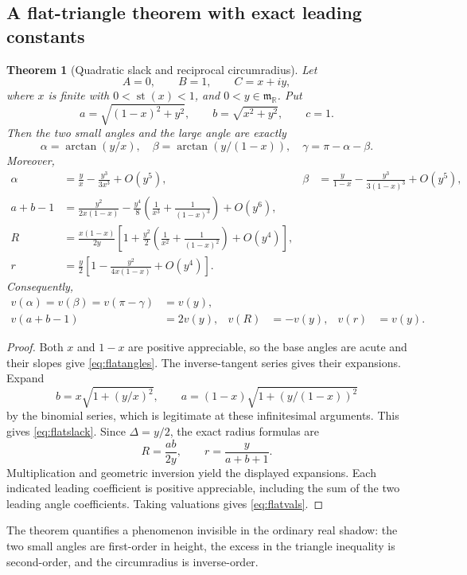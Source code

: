 \documentclass[11pt]{article}
\numberwithin{equation}{section}
\newtheorem{theorem}{Theorem}[section]
\theoremstyle{definition}
\newcommand{\R}{\mathbb R}
\newcommand{\mm}{\mathfrak m}
\newcommand{\st}{\operatorname{st}}
\begin{document}
\subsection{A flat-triangle theorem with exact leading constants}
\begin{theorem}[Quadratic slack and reciprocal circumradius]\label{thm:flat}
Let
\[
 A=0,\qquad B=1,\qquad C=x+iy,
\]
where $x$ is finite with $0<\st(x)<1$, and $0<y\in\mm_{\R}$. Put
\[
 a=\sqrt{(1-x)^2+y^2},\qquad b=\sqrt{x^2+y^2},\qquad c=1.
\]
Then the two small angles and the large angle are exactly
\begin{equation}\label{eq:flatangles}
 \alpha=\arctan(y/x),\quad
 \beta=\arctan(y/(1-x)),\quad
 \gamma=\pi-\alpha-\beta.
\end{equation}
Moreover,
\begin{align}
 \alpha&=\frac yx-\frac{y^3}{3x^3}+O(y^5),&
 \beta&=\frac y{1-x}-\frac{y^3}{3(1-x)^3}+O(y^5),\\
 a+b-1&=\frac{y^2}{2x(1-x)}
 -\frac{y^4}{8}\left(\frac1{x^3}+\frac1{(1-x)^3}\right)+O(y^6),
 \label{eq:flatslack}\\
 R&=\frac{x(1-x)}{2y}
 \left[1+\frac{y^2}{2}\left(\frac1{x^2}+\frac1{(1-x)^2}\right)+O(y^4)\right],\\
 r&=\frac y2\left[1-\frac{y^2}{4x(1-x)}+O(y^4)\right].
\end{align}
Consequently,
\begin{align}
 v(\alpha)=v(\beta)=v(\pi-\gamma)&=v(y),\\
 v(a+b-1)&=2v(y),& v(R)&=-v(y),&v(r)&=v(y).
 \label{eq:flatvals}
\end{align}
\end{theorem}
\begin{proof}
Both $x$ and $1-x$ are positive appreciable, so the base angles are acute and their slopes give \eqref{eq:flatangles}. The inverse-tangent series gives their expansions. Expand
\[
 b=x\sqrt{1+(y/x)^2},\qquad
 a=(1-x)\sqrt{1+(y/(1-x))^2}
\]
by the binomial series, which is legitimate at these infinitesimal arguments. This gives \eqref{eq:flatslack}. Since $\Delta=y/2$, the exact radius formulas are
\[
 R=\frac{ab}{2y},\qquad r=\frac{y}{a+b+1}.
\]
Multiplication and geometric inversion yield the displayed expansions. Each indicated leading coefficient is positive appreciable, including the sum of the two leading angle coefficients. Taking valuations gives \eqref{eq:flatvals}.
\end{proof}
The theorem quantifies a phenomenon invisible in the ordinary real shadow: the two small angles are first-order in height, the excess in the triangle inequality is second-order, and the circumradius is inverse-order.
\end{document}
